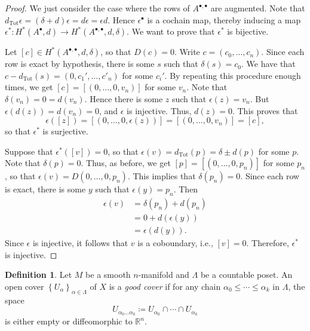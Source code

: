 \documentclass[10pt,letterpaper,cm]{nupset}
\theoremstyle{definition}
\newtheorem{definition}{Definition}[subsection]
\theoremstyle{theorem}
\theoremstyle{remark}
\newcommand{\R}{\mathbb{R}}
\newcommand{\1}{\mathbb{1}}
\newcommand{\0}{\vec 0}
\DeclareMathOperator{\tot}{Tot}
\begin{document}
\begin{proof}
We just consider the case where the rows of $A^{\bullet, \bullet}$ are augmented. Note that $d_{\tot}{\epsilon} = (\delta + d){\epsilon} = d{\epsilon} = \epsilon{d}$. Hence $\epsilon^{\bullet}$ is a cochain map, thereby inducing a map $\epsilon^{\ast} : H^{\ast}(A^{\bullet}, d) \to H^{\ast}(A^{\bullet, \bullet}, d, \delta)$. We want to prove that $\epsilon^{\ast}$ is bijective. 

\medskip


Let $[c] \in H^{\ast}(A^{\bullet, \bullet}, d, \delta)$, so that $D(c) =0$. Write $c= (c_0, \ldots, c_n)$. Since each row is exact by hypothesis, there is some $s$ such that $\delta(s) = c_0$. We have that $c- d_{\tot}(s) = (0, c_1', \ldots, c'_n)$ for some $c_i'$. By repeating this procedure enough times, we get $[c] = [(0, \ldots, 0, v_n)]$ for some $v_n$. Note that $\delta(v_n) =0 = d(v_n)$. Hence there is some $z$ such that $\epsilon(z) = v_n$.   But $\epsilon(d(z)) = d(v_n) =0$, and $\epsilon$ is injective. Thus, $d(z) =0$. This proves that $$\epsilon([z]) = [(0, \ldots, 0, \epsilon(z))]  = [(0, \ldots, 0, v_n)] = [c],$$ so that $\epsilon^{\ast}$ is surjective.

\medskip

 Suppose that $\epsilon^{\ast}([v]) =0$, so that  $\epsilon(v) = d_{\tot}(p) = \delta \pm d(p)$ for some $p$. Note that $\delta(p) =0$. Thus, as before, we get $[p] = [(0, \ldots, 0, p_n)]$ for some $p_n$, so that $\epsilon(v) = D(0, \ldots, 0, p_n)$. This implies that $\delta(p_n) =0$. Since each row is exact, there is some $y$ such that $\epsilon(y) = p_n$. Then 
\begin{align*}
\epsilon(v) & = \delta(p_n) +d(p_n) 
\\ &= 0 + d(\epsilon(y))
\\ & =  \epsilon(d(y)).
\end{align*}
Since $\epsilon$ is injective, it follows that $v$ is a coboundary, i.e., $[v]=0$. Therefore, $\epsilon^{\ast}$ is injective. 
\end{proof}

\begin{definition}
Let $M$ be a smooth $n$-manifold and $\Lambda$ be a countable poset. An open cover $\left\{U_{\alpha}\right\}_{\alpha \in \Lambda}$ of $X$ is a \textit{good cover} if for any chain $\alpha_0\leq \cdots \leq \alpha_k$ in $\Lambda$, the space $$U_{\alpha_0\ldots \alpha_k}\coloneqq  U_{\alpha_0} \cap \cdots \cap U_{\alpha_k}$$ is either empty or diffeomorphic to $\R^n$.
\end{definition}
\end{document}
